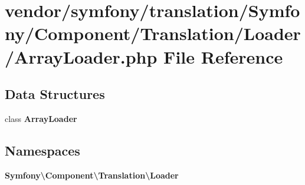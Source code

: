 \section{vendor/symfony/translation/\+Symfony/\+Component/\+Translation/\+Loader/\+Array\+Loader.php File Reference}
\label{_array_loader_8php}
\subsection*{Data Structures}
\begin{DoxyCompactItemize}
\item 
class {\bf Array\+Loader}
\end{DoxyCompactItemize}
\subsection*{Namespaces}
\begin{DoxyCompactItemize}
\item 
 {\bf Symfony\textbackslash{}\+Component\textbackslash{}\+Translation\textbackslash{}\+Loader}
\end{DoxyCompactItemize}
